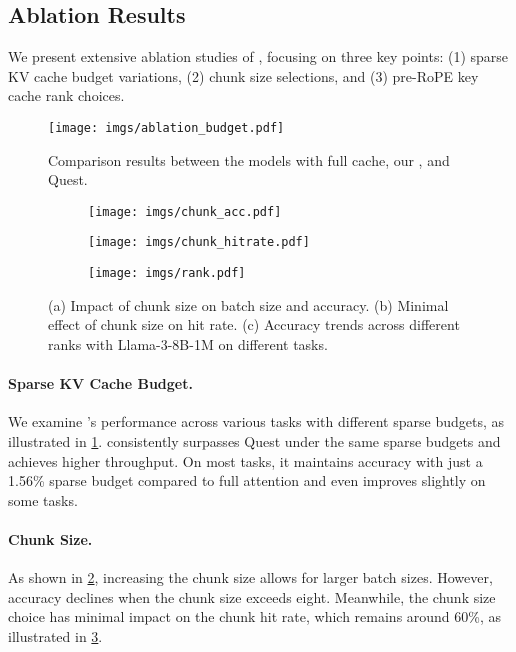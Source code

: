\subsection{Ablation Results}
\label{sec:ab}
We present extensive ablation studies of \Sys, focusing on three key points:  (1) sparse KV cache budget variations, (2) chunk size selections, and (3) pre-RoPE key cache rank choices.

\begin{figure}[t]
    \centering
    \texttt{[image: imgs/ablation\_budget.pdf]}
    \caption{Comparison results between the models with full cache, our \Sys, and Quest.}
    \label{fig:ablation_budget}
\end{figure}

\begin{figure}[t]
    \centering
   \begin{subfigure}[b]{0.32\textwidth}
        \texttt{[image: imgs/chunk\_acc.pdf]}
        \caption{}
        \label{fig:chunk_acc}
   \end{subfigure}
   \hfill
    \begin{subfigure}[b]{0.32\textwidth}
        \texttt{[image: imgs/chunk\_hitrate.pdf]}
        \caption{}
        \label{fig:chunk_hitrate}
    \end{subfigure}
    \hfill
    \begin{subfigure}[b]{0.32\textwidth}
        \texttt{[image: imgs/rank.pdf]}
        \caption{}
        \label{fig:ablation_rank}
   \end{subfigure}
    \caption{(a) Impact of chunk size on batch size and accuracy. (b) Minimal effect of chunk size on hit rate. (c) Accuracy trends across different ranks with Llama-3-8B-1M on different tasks.}
    \label{fig:observation}
\end{figure}

\paragraph{Sparse KV Cache Budget.} We examine \Sys's performance across various tasks with different sparse budgets, as illustrated in \cref{fig:ablation_budget}. \Sys consistently surpasses Quest under the same sparse budgets and achieves higher throughput. On most tasks, it maintains accuracy with just a 1.56\% sparse budget compared to full attention and even improves slightly on some tasks.

\paragraph{Chunk Size.} As shown in \cref{fig:chunk_acc}, increasing the chunk size allows for larger batch sizes. However, accuracy declines when the chunk size exceeds eight. Meanwhile, the chunk size choice has minimal impact on the chunk hit rate, which remains around 60\%, as illustrated in \cref{fig:chunk_hitrate}.

